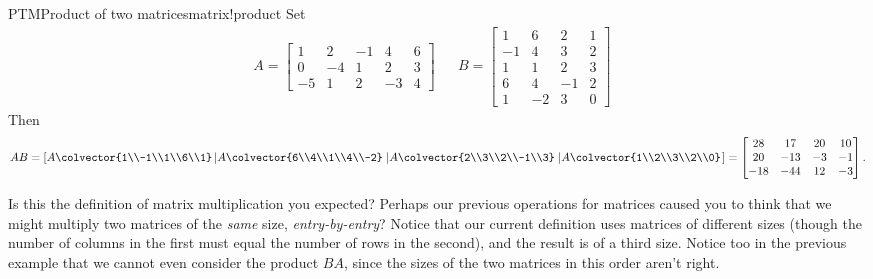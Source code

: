 \begin{example}{PTM}{Product of two matrices}{matrix!product}
Set
%
\begin{align*}
A=
\begin{bmatrix}
1 & 2 & -1 & 4 & 6\\
0 & -4 & 1 & 2 & 3\\
-5 & 1 & 2 & -3 & 4
\end{bmatrix}
&&
B=
\begin{bmatrix}
1 & 6 & 2 & 1\\
-1 & 4 & 3 & 2\\
1 & 1 & 2 & 3\\
6 & 4 & -1 & 2\\
1 & -2 & 3 & 0
\end{bmatrix} & 
\end{align*}
%
Then
%
\begin{equation*}
AB=
\left[
A\colvector{1\\-1\\1\\6\\1}
\left\lvert A\colvector{6\\4\\1\\4\\-2}\right.
\left\lvert A\colvector{2\\3\\2\\-1\\3}\right.
\left\lvert A\colvector{1\\2\\3\\2\\0}\right.
\right]
=
\begin{bmatrix}
28 & 17 & 20 & 10\\
20 & -13 & -3 & -1\\
-18 & -44 & 12 & -3
\end{bmatrix}.
\end{equation*}
%
\end{example}
%
Is this the definition of matrix multiplication you expected?  Perhaps our previous operations for matrices caused you to think that we might multiply two matrices of the {\em same} size, {\em entry-by-entry}?  Notice that our current definition uses matrices of different sizes (though the number of columns in the first must equal the number of rows in the second), and the result is of a third size.  Notice too in the previous example that we cannot even consider the product $BA$, since the sizes of the two matrices in this order aren't right.\par
